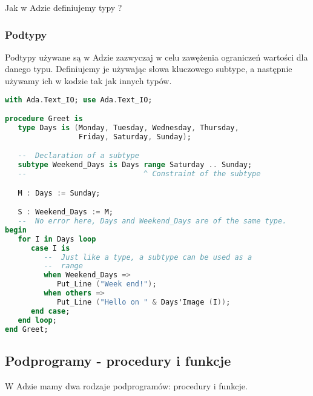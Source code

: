 \documentclass[a4paper,15pt]{article}
\newcommand{\ask}[2]{
    \begin{tcolorbox}[colback=black!5!white,colframe=gray,title={Pytanie #1}]
        #2
    \end{tcolorbox}
}
\begin{document}
\ask{}{
Jak w Adzie definiujemy typy ?
}

\subsubsection{Podtypy}

Podtypy używane są w Adzie zazwyczaj w celu zawężenia ograniczeń wartości dla danego typu. Definiujemy je używając słowa kluczowego subtype, a następnie używamy ich w kodzie tak jak innych typów. 

\begin{lstlisting}[language=Ada]
with Ada.Text_IO; use Ada.Text_IO;

procedure Greet is
   type Days is (Monday, Tuesday, Wednesday, Thursday,
                 Friday, Saturday, Sunday);

   --  Declaration of a subtype
   subtype Weekend_Days is Days range Saturday .. Sunday;
   --                           ^ Constraint of the subtype

   M : Days := Sunday;

   S : Weekend_Days := M;
   --  No error here, Days and Weekend_Days are of the same type.
begin
   for I in Days loop
      case I is
         --  Just like a type, a subtype can be used as a
         --  range
         when Weekend_Days =>
            Put_Line ("Week end!");
         when others =>
            Put_Line ("Hello on " & Days'Image (I));
      end case;
   end loop;
end Greet;
\end{lstlisting}



\subsection{Podprogramy - procedury i funkcje}
W Adzie mamy dwa rodzaje podprogramów: procedury i funkcje.
\end{document}
